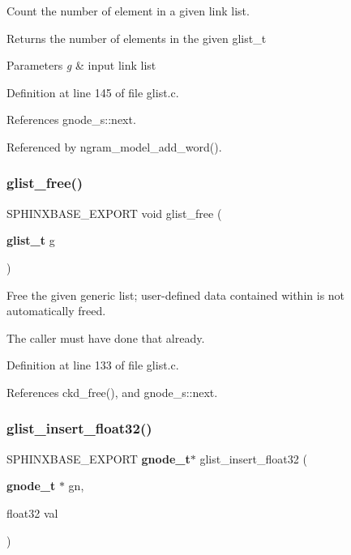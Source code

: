 Count the number of element in a given link list. 

\begin{DoxyReturn}{Returns}
the number of elements in the given glist\+\_\+t 
\end{DoxyReturn}

\begin{DoxyParams}{Parameters}
{\em g} & input link list \\
\hline
\end{DoxyParams}


Definition at line 145 of file glist.\+c.



References gnode\+\_\+s\+::next.



Referenced by ngram\+\_\+model\+\_\+add\+\_\+word().

\mbox{\label{glist_8h_a45380e15d2c33afc554fd60a8828580c}} 
\subsubsection{glist\+\_\+free()}
{\footnotesize\ttfamily S\+P\+H\+I\+N\+X\+B\+A\+S\+E\+\_\+\+E\+X\+P\+O\+RT void glist\+\_\+free (\begin{DoxyParamCaption}\item[{\textbf{ glist\+\_\+t}}]{g }\end{DoxyParamCaption})}



Free the given generic list; user-\/defined data contained within is not automatically freed. 

The caller must have done that already. 

Definition at line 133 of file glist.\+c.



References ckd\+\_\+free(), and gnode\+\_\+s\+::next.

\mbox{\label{glist_8h_aff08aed022168872fc9d30cd299df2ce}} 
\subsubsection{glist\+\_\+insert\+\_\+float32()}
{\footnotesize\ttfamily S\+P\+H\+I\+N\+X\+B\+A\+S\+E\+\_\+\+E\+X\+P\+O\+RT \textbf{ gnode\+\_\+t}$\ast$ glist\+\_\+insert\+\_\+float32 (\begin{DoxyParamCaption}\item[{\textbf{ gnode\+\_\+t} $\ast$}]{gn,  }\item[{float32}]{val }\end{DoxyParamCaption})}



